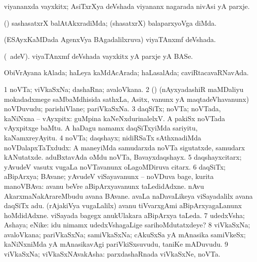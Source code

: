 \bentry
{} 
\gl{\nA}
\bmng
 viyananxda vayxkitx; AsiTxrXya deVshada viyananx nagarada nivAsi yA parxje. 
\emng
\eentry

\bentry
{} 
\gl{\kirxvi}
\expl{\Latin }
\bmng
 (\nAyxshA) sashasatxrX balAtAkxradiMda; (shasatxrX) balaparxyoVga diMda. 
\emng
\eentry

\bentry
{} 
\gl{\gu}
\expl{}
\bmng
 (ESAyxKaMDada AgenxVya BAgadalilxruva) viyaTAnxmf deVshada. 
\emng
\eentry

\bentry
{} 
\gl{\nA}
\expl{}
\bmng
(\bava\ adeV). viyaTAnxmf deVshada vayxkitx yA parxje yA BASe. 
\emng
\eentry

\bentry
{} 
\gl{\gu}
\expl{\F}
\bmng
 ObiVrAyana kAlada; haLeya kaMdAcArada; haLasalAda; caviRtacavaRNavAda. 
\emng
\eentry

\bentry
{} 
\gl{\nA}
\expl{}
\bmng
\bnum
\num{1} noVTa; viVkaSxNa; dashaRna; avaloVkana. 
\num{2} (\nAyxshA) (nAyxyadashiR maMDaliyu mokadadxmege saMbaMdhisida sathxLa, Asitx, \mo vanunx yA maqtadeVhavanunx) noVDuvudu; parishiVlane; pariVkaSxNa. 
\num{3} daqSiTx; noVTa; noVTada, kaNiNxna -- vAyxpitx:  guMpina kaNeNxdurinalelxV.  A pakiSx noVTada vAyxpitxge baMtu.  A haDagu namamx daqSiTxyiMda sariyitu, kaNamxreyAyitu. 
\num{4} noVTa; daqshayx; nidiRSaTx sAthxnadiMda noVDalapxTaTxdudx:  A maneyiMda samudarxda noVTa sigutatxde, samudarx kANutatxde.  aduBxtavAda oMdu noVTa, Bavayxdaqshayx. 
\num{5} daqshayxcitarx; yAvudeV vasutx \mo vugaLa noVTavanunx oLagoMDiruva citarx. 
\num{6} daqSiTx; aBipArxya; BAvane; yAvudeV viSayavanunx -- noVDuva bage, kurita manoVBAva:  avanu beVre aBipArxyavanunx taLedidAdxne.  nAvu AkarxmaNakArareMbudu avana BAvane.  avaLa naDavaLikeya viSayadalilx avana daqSiTx adu.  (rAjakiVya \mo vugaLalilx) avanu tiVvarxgAmi aBipArxyagaLanunx hoMdidAdxne.  viSayada bagegx anukUlakara aBipArxya taLeda. 
\num{7} udedxVsha; Ashaya; eNike:  idu nimamx udedxVshagaLige sarihoMdutatxdeye? 
\num{8} viVkaSxNa; avaloVkana; pariVkaSxNa; samiVkaSxNa; cAkuSxSa yA mAnasika samiVkeSx; kaNiNxniMda yA mAnasikavAgi pariVkiSxsuvudu, taniKe mADuvudu. 
\num{9} viVkaSxNa; viVkaSxNAvakAsha:  parxdashaRnada viVkaSxNe, noVTa. 
\enum
\emng

